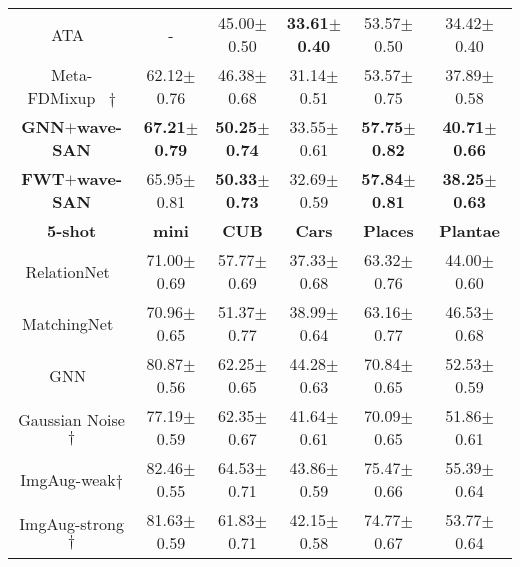 \documentclass{article}
\newcommand{\mypm}{\scriptsize$\pm$}
\begin{document}
\begin{table*}[!t]
\begin{center}
\begin{tabular} { c c c c c c}
				ATA~\cite{wang2021cross} & - & 45.00\mypm0.50 & \textbf{33.61\mypm0.40} & 53.57\mypm0.50 & 34.42\mypm0.40 \\
				
				Meta-FDMixup~\cite{fu2021meta} $\dagger$ & 62.12\mypm0.76	& 46.38\mypm0.68	& 31.14\mypm0.51	& 53.57\mypm0.75 & 37.89\mypm0.58 \\


				\hline
				
\textbf{GNN$+$wave-SAN} & 
				\textbf{67.21\mypm0.79}& \textbf{50.25\mypm0.74} & 
				33.55\mypm0.61 & 
				\textbf{57.75\mypm0.82} & \textbf{40.71\mypm0.66} \\
				
						 		
				
				\textbf{FWT$+$wave-SAN} & 
				65.95\mypm0.81 & \textbf{50.33\mypm0.73} & 
				32.69\mypm0.59
				& \textbf{57.84\mypm0.81} & \textbf{38.25\mypm0.63} \\
				
	

				
				
				\hline
				\hline
				
				\textbf{5-shot}  &  \textbf{mini} & \textbf{CUB} & \textbf{Cars} & \textbf{Places} & \textbf{Plantae} \\
				\hline       


				RelationNet~\cite{sung2018learning} & 71.00\mypm0.69 & 57.77\mypm0.69 & 37.33\mypm0.68 & 63.32\mypm0.76 & 44.00\mypm0.60\\
				
				MatchingNet~\cite{vinyals2016matching} & 70.96\mypm0.65 & 51.37\mypm0.77 & 38.99\mypm0.64 & 63.16\mypm0.77 & 46.53\mypm0.68\\
				
				GNN~\cite{garcia2017few} &  80.87\mypm0.56 & 62.25\mypm0.65 & 44.28\mypm0.63 & 70.84\mypm0.65 & 52.53\mypm0.59\\
				\hline
				
Gaussian Noise$\dagger$   &  77.19\mypm0.59	& 62.35\mypm0.67	& 41.64\mypm0.61	& 70.09\mypm0.65	& 51.86\mypm0.61 \\
				
				ImgAug-weak$\dagger$      & 82.46\mypm0.55 & 64.53\mypm0.71 & 43.86\mypm0.59 & 75.47\mypm0.66 & 55.39\mypm0.64 \\
				
				ImgAug-strong$\dagger$   & 81.63\mypm0.59 & 61.83\mypm0.71 & 42.15\mypm0.58 & 74.77\mypm0.67 & 53.77\mypm0.64 \\
				





\end{tabular}
\end{center}
\end{table*}
\end{document}
